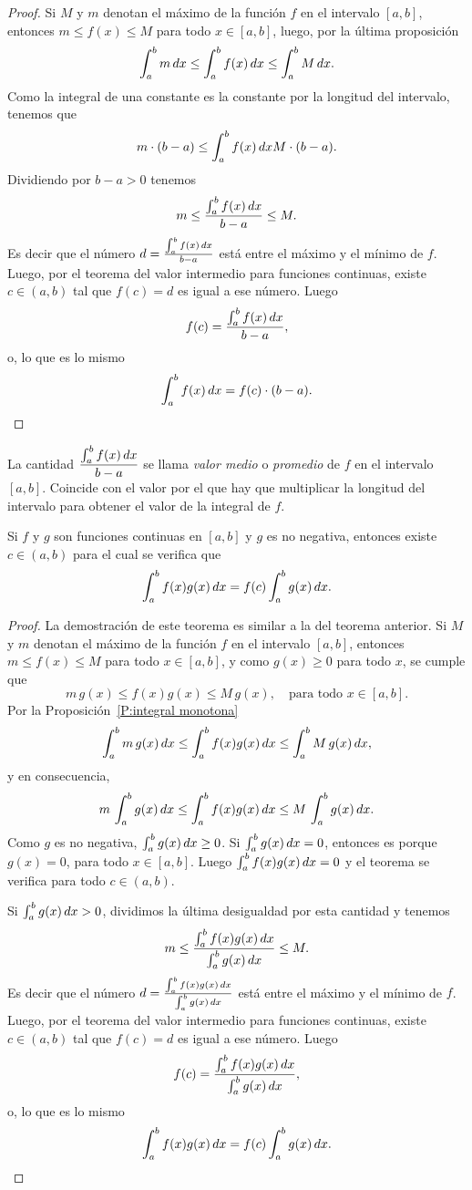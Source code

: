 \begin{proof}
  Si $M$ y $m$ denotan el máximo de la función $f$ en el intervalo $[a,b]$, entonces $m\le f(x)\le M$ para todo $x\in[a,b]$, luego, por la última proposición
  \[
  \int_a^b m\,dx
  \le \int_a^b f(x)\,dx
  \le \int_a^b M\,dx.
  \]
  Como la integral de una constante es la constante por la longitud del intervalo, tenemos que
  \[
    m\cdot(b-a)
    \le \int_a^b f(x)\,dx
    M\cdot(b-a).
  \]
  Dividiendo por $b-a>0$ tenemos
  \[
  m \le \frac{\int_a^b f(x)\,dx}{b-a}\le M.
  \]
  Es decir que el número $d=\frac{\int_a^b f(x)\,dx}{b-a}$ está entre el máximo y el mínimo de $f$. Luego, por el teorema del valor intermedio para funciones continuas, existe $c\in(a,b)$ tal que $f(c)=d$ es igual a ese número. Luego
  \[
  f(c) = \frac{\int_a^b f(x)\,dx}{b-a},
  \]
  o, lo que es lo mismo
  \[
  \int_a^b f(x)\,dx = f(c)\cdot(b-a).
  \qedhere
  \]
\end{proof}

\begin{remark}
  La cantidad $\displaystyle \frac{\int_a^b f(x)\,dx}{b-a}$ se llama \emph{valor medio} o \emph{promedio} de $f$ en el intervalo $[a,b]$. Coincide con el valor por el que hay que multiplicar la longitud del intervalo para obtener el valor de la integral de $f$.
\end{remark}

\begin{theorem}
Si $f$ y $g$ son funciones continuas en $[a,b]$ y $g$ es no negativa, entonces existe $c\in(a,b)$ para el cual se verifica que
\[
\int_a^b f(x)g(x)\,dx = f(c) \int_a^b g(x)\,dx.
\] 
\end{theorem}

\begin{proof}
  La demostración de este teorema es similar a la del teorema anterior. 
  Si $M$ y $m$ denotan el máximo de la función $f$ en el intervalo $[a,b]$, entonces $m\le f(x)\le M$ para todo $x\in[a,b]$, y como $g(x)\ge 0$ para todo $x$, se cumple que
  \[
  m\,g(x)\le f(x)g(x)\le M\,g(x), \quad\text{para todo $x\in[a,b]$.}
  \]
  Por la Proposición~\ref{P:integral monotona}
  \[
  \int_a^b m\,g(x)\,dx
  \le \int_a^b f(x)g(x)\,dx
  \le \int_a^b M\,g(x)\,dx,
  \]
  y en consecuencia,
  \[
    m\,\int_a^b g(x)\,dx
  \le \int_a^b f(x)g(x)\,dx
  \le M\,\int_a^b g(x)\,dx.
  \]
  Como $g$ es no negativa, $\int_a^b g(x)\,dx\ge 0$. 
  Si $\int_a^b g(x)\,dx=0$, entonces es porque $g(x)=0$, para todo $x\in[a,b]$.
  Luego $\int_a^b f(x)g(x)\,dx=0$ y el teorema se verifica para todo $c\in(a,b)$.
  
  Si $\int_a^b g(x)\,dx > 0$, dividimos la última desigualdad por esta cantidad y tenemos
  \[
    m
    \le \frac{\int_a^b f(x)g(x)\,dx}{\int_a^b g(x)\,dx}
    \le M.
  \]
  Es decir que el número $d=\frac{\int_a^b f(x)g(x)\,dx}{\int_a^b g(x)\,dx}$ está entre el máximo y el mínimo de $f$. Luego, por el teorema del valor intermedio para funciones continuas, existe $c\in(a,b)$ tal que $f(c)=d$ es igual a ese número. Luego
  \[
  f(c) = \frac{\int_a^b f(x)g(x)\,dx}{\int_a^b g(x)\,dx},
  \]
  o, lo que es lo mismo
  \[
  \int_a^b f(x)g(x)\,dx = f(c)\int_a^b g(x)\,dx.
  \qedhere
  \]
\end{proof}

